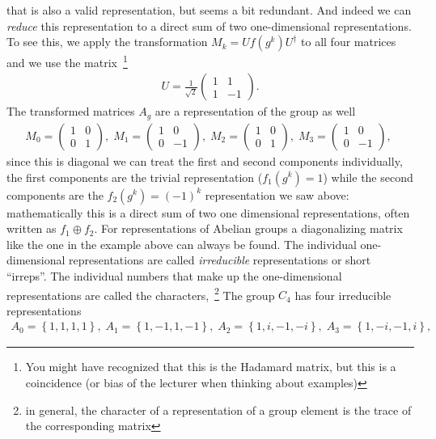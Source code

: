 that is also a valid representation, but seems a bit redundant. And indeed we can \textit{reduce} this representation to a direct sum of two one-dimensional representations. To see this, we apply the transformation $M_k = Uf(g^k)U^\dagger$ to all four matrices and we use the matrix~\footnote{You might have recognized that this is the Hadamard matrix, but this is a coincidence (or bias of the lecturer when thinking about examples)}
\begin{align}
    U = \frac{1}{\sqrt{2}}\begin{pmatrix}
        1 & 1\\1 & -1
    \end{pmatrix}.
\end{align}
The transformed matrices $A_g$ are a representation of the group as well
\begin{align}
    M_0 = \begin{pmatrix} 1 & 0 \\ 0 & 1 \end{pmatrix},\;
    M_1 = \begin{pmatrix} 1 & 0 \\ 0 & -1 \end{pmatrix},\;
    M_2 = \begin{pmatrix} 1 & 0 \\ 0 & 1 \end{pmatrix},\;
    M_3 = \begin{pmatrix} 1 & 0 \\ 0 & -1 \end{pmatrix},\;
\end{align}
since this is diagonal we can treat the first and second components individually, the first components are the trivial representation ($f_1(g^k)=1$) while the second components are the $f_2(g^k)=(-1)^k$ representation we saw above: mathematically this is a direct sum of two one dimensional representations, often written as $f_1 \oplus f_2$. 
For representations of Abelian groups a diagonalizing matrix like the one in the example above can always be found. The individual one-dimensional representations are called \textit{irreducible} representations or short ``irreps''. The individual numbers that make up the one-dimensional representations are called the characters,~\footnote{in general, the character of a representation of a group element is the trace of the corresponding matrix} The group $C_4$ has four irreducible representations
\begin{align}
    A_0=\left\{1,1,1,1\right\},\;
    A_1=\left\{1,-1,1,-1\right\},\; 
    A_2=\left\{1,i,-1,-i\right\},\;
    A_3=\left\{1,-i,-1,i\right\},\; 
\end{align}
